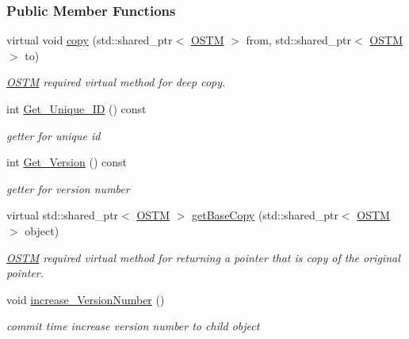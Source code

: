 \subsubsection*{Public Member Functions}
\begin{DoxyCompactItemize}
\item 
virtual void \hyperlink{class_o_s_t_m_a535d90fced5adbb70312c92f3778e08d_a535d90fced5adbb70312c92f3778e08d}{copy} (std\+::shared\+\_\+ptr$<$ \hyperlink{class_o_s_t_m}{O\+S\+TM} $>$ from, std\+::shared\+\_\+ptr$<$ \hyperlink{class_o_s_t_m}{O\+S\+TM} $>$ to)
\begin{DoxyCompactList}\small\item\em \hyperlink{class_o_s_t_m}{O\+S\+TM} required virtual method for deep copy. \end{DoxyCompactList}\item 
int \hyperlink{class_o_s_t_m_a5a01a8b98d16b1d1904ecf9356e7b71d_a5a01a8b98d16b1d1904ecf9356e7b71d}{Get\+\_\+\+Unique\+\_\+\+ID} () const 
\begin{DoxyCompactList}\small\item\em getter for unique id \end{DoxyCompactList}\item 
int \hyperlink{class_o_s_t_m_a1f1db9d482f22c8e7caa17dfb340626b_a1f1db9d482f22c8e7caa17dfb340626b}{Get\+\_\+\+Version} () const 
\begin{DoxyCompactList}\small\item\em getter for version number \end{DoxyCompactList}\item 
virtual std\+::shared\+\_\+ptr$<$ \hyperlink{class_o_s_t_m}{O\+S\+TM} $>$ \hyperlink{class_o_s_t_m_a0bfa3763bd441407dd6365f42714f94c_a0bfa3763bd441407dd6365f42714f94c}{get\+Base\+Copy} (std\+::shared\+\_\+ptr$<$ \hyperlink{class_o_s_t_m}{O\+S\+TM} $>$ object)
\begin{DoxyCompactList}\small\item\em \hyperlink{class_o_s_t_m}{O\+S\+TM} required virtual method for returning a pointer that is copy of the original pointer. \end{DoxyCompactList}\item 
void \hyperlink{class_o_s_t_m_a5f90caa4384d371c16b7cac860d9f89a_a5f90caa4384d371c16b7cac860d9f89a}{increase\+\_\+\+Version\+Number} ()
\begin{DoxyCompactList}\small\item\em commit time increase version number to child object \end{DoxyCompactList}\item 

\end{DoxyCompactItemize}
